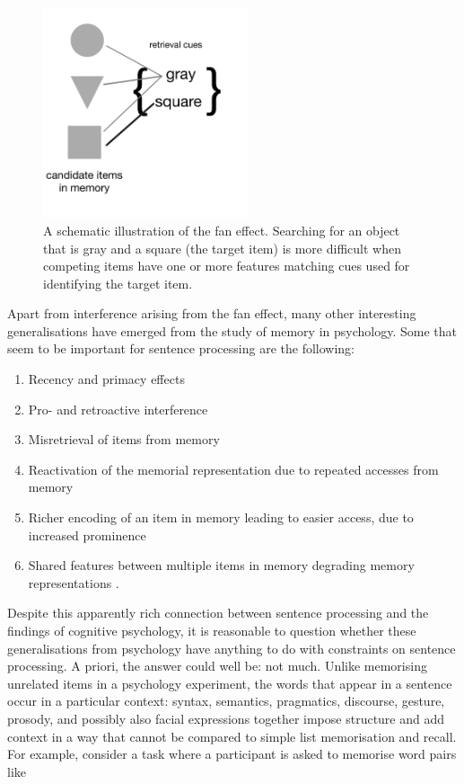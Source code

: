 \documentclass{cambridge7A}\usepackage[]{graphicx}\usepackage[]{color}
\begin{document}
\begin{figure}[!htbp]
\centering
\includegraphics[width=6cm]{figures/spreadingactivation}
\caption{A schematic illustration of the fan effect. Searching for an object that is gray and a square (the target item) is more difficult when competing items have one or more features matching cues used for identifying the target item.}\label{fig:faneffect}
\end{figure}
 
Apart from interference arising from the fan effect, many other interesting generalisations have emerged from the study of memory in psychology. Some that seem to be important for sentence processing are the following: 
 
 \begin{enumerate}
\item Recency and primacy effects \citep{Nairne1988,gibsonetal96}
 
\item Pro- and retroactive interference \citep{WatkinsWatkins1975,keppelunderwood,lewis:magical}
\item  Misretrieval of items from memory \citep{patson2016misinterpretations}
\item Reactivation of the memorial representation  due to repeated accesses from memory \citep{VasishthLewis2006} 
 
\item Richer encoding of an item in memory leading to easier access, due to increased prominence \citep{hofmeister07,hofmeister2011representational,HofmeisterVasishth2014}
\item Shared features between multiple items in memory degrading memory representations \citep{Nairne1990,OberauerKliegl2006,VasishthEtAlICCM2017}. 
\end{enumerate}

Despite this apparently rich connection between sentence processing and the findings of cognitive psychology, it  is  reasonable to question whether these generalisations  from psychology have anything to do with constraints on sentence processing. A priori, the answer  could well be: not much. Unlike memorising unrelated items in a psychology experiment, the words that appear in a sentence occur in a particular context: syntax, semantics, pragmatics, discourse, gesture, prosody, and possibly also facial expressions together impose structure and add context in a way that cannot be compared to  simple list memorisation and recall.
  For example, consider  a task where a participant is asked to memorise word pairs  like
  
\end{document}
